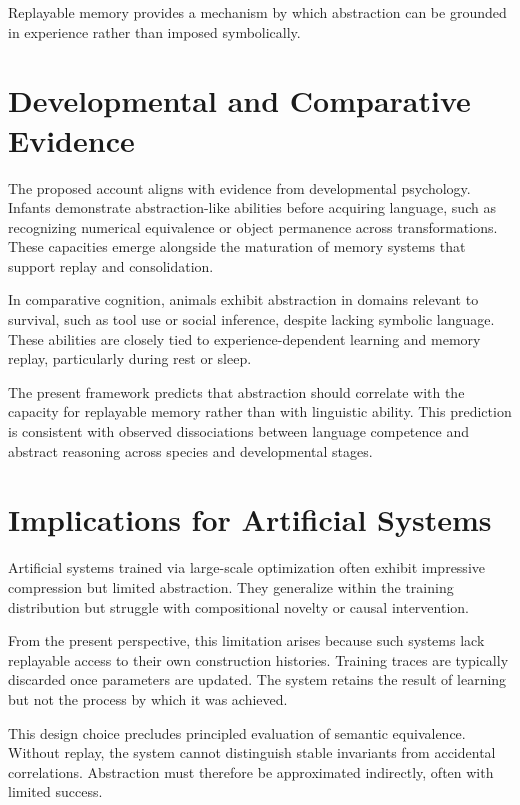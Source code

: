 \documentclass[11pt]{article}
\begin{document}
Replayable memory provides a mechanism by which abstraction can be grounded in experience rather than imposed symbolically.

\section{Developmental and Comparative Evidence}

The proposed account aligns with evidence from developmental psychology. Infants demonstrate abstraction-like abilities before acquiring language, such as recognizing numerical equivalence or object permanence across transformations. These capacities emerge alongside the maturation of memory systems that support replay and consolidation.

In comparative cognition, animals exhibit abstraction in domains relevant to survival, such as tool use or social inference, despite lacking symbolic language. These abilities are closely tied to experience-dependent learning and memory replay, particularly during rest or sleep.

The present framework predicts that abstraction should correlate with the capacity for replayable memory rather than with linguistic ability. This prediction is consistent with observed dissociations between language competence and abstract reasoning across species and developmental stages.

\section{Implications for Artificial Systems}

Artificial systems trained via large-scale optimization often exhibit impressive compression but limited abstraction. They generalize within the training distribution but struggle with compositional novelty or causal intervention.

From the present perspective, this limitation arises because such systems lack replayable access to their own construction histories. Training traces are typically discarded once parameters are updated. The system retains the result of learning but not the process by which it was achieved.

This design choice precludes principled evaluation of semantic equivalence. Without replay, the system cannot distinguish stable invariants from accidental correlations. Abstraction must therefore be approximated indirectly, often with limited success.
\end{document}
